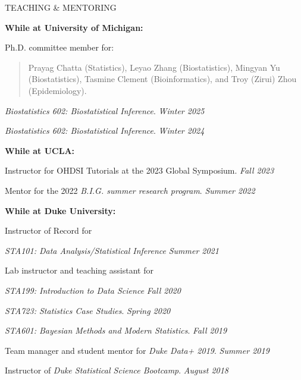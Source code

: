 \documentclass{resume} %
\newcommand{\thisYear}[1]{
	#1
}
\begin{document}
\begin{rSection}{TEACHING \& MENTORING}
	
\hspace*{-0.2in}\textbf{While at University of Michigan:}

Ph.D.  committee member for: 

\begin{quote}
	Prayag Chatta (Statistics), Leyao Zhang (Biostatistics),  Mingyan Yu (Biostatistics), Tasmine Clement (Bioinformatics), and Troy (Zirui) Zhou (Epidemiology). 
\end{quote}
	
		\thisYear{
    \emph{Biostatistics 602: Biostatistical Inference}.  \hfill {\em Winter 2025}
}

 \emph{Biostatistics 602: Biostatistical Inference}.  \hfill {\em Winter 2024}

\smallskip 

\hspace*{-0.2in}\textbf{While at UCLA:}
	
	Instructor for OHDSI Tutorials at the 2023 Global Symposium.  \hfill {\em Fall 2023}
		
	Mentor for the 2022 \emph{B.I.G. summer research program}.  \hfill {\em Summer 2022}
	
\smallskip 
	
\hspace*{-0.2in}\textbf{While at Duke University:}
	
	Instructor of Record for 
	
	\emph{STA101: Data Analysis/Statistical Inference} \hfill {\em Summer 2021}
	
	Lab instructor and teaching assistant for 
	
	\hspace{0.2in} \emph{STA199: Introduction to Data Science} \hfill {\em Fall 2020}
	
	\hspace{0.2in} \emph{STA723: Statistics Case Studies}. \hfill {\em Spring 2020}
	
	\hspace{0.2in} \emph{STA601: Bayesian Methods and Modern Statistics}. \hfill {\em Fall 2019}
	
	
	Team manager and student mentor for \emph{Duke Data+ 2019}. \hfill {\em Summer 2019}
	
	Instructor of \emph{Duke Statistical Science Bootcamp}. \hfill {\em August 2018}
\end{rSection}
\end{document}
